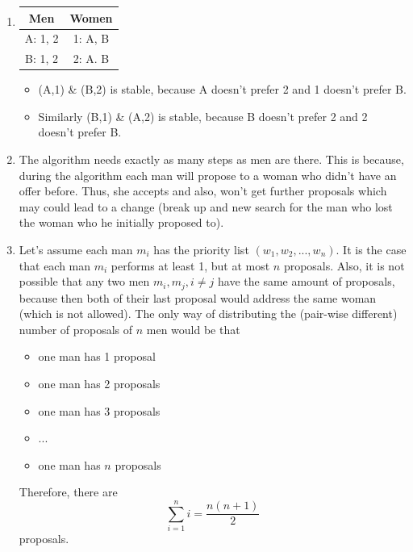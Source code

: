 \documentclass{scrartcl}
\begin{document}
	\begin{enumerate}
		\item\phantom{phantom}
		\begin{center}
			\begin{tabular}{c|c}
				Men & Women\\
				\hline
				A: 1, 2 & 1: A, B\\
				B: 1, 2 & 2: A. B
			\end{tabular}
		\end{center}
		\begin{itemize}
			\item (A,1) \& (B,2) is stable, because A doesn't prefer 2 and 1 doesn't prefer B.
			\item Similarly (B,1) \& (A,2) is stable, because B doesn't prefer 2 and 2 doesn't prefer B.
		\end{itemize}
		
		\item The algorithm needs exactly as many steps as men are there.
		This is because, during the algorithm each man will propose to a woman who didn't have an offer before.
		Thus, she accepts and also, won't get further proposals which may could lead to a change (break up and new search for the man who lost the woman who he initially proposed to).
		
		\item Let's assume each man $m_i$ has the priority list $(w_1, w_2, ..., w_n)$.
		It is the case that each man $m_i$ performs at least 1, but at most $n$ proposals.
		Also, it is not possible that any two men $m_i, m_j, i\neq j$ have the same amount of proposals, because then both of their last proposal would address the same woman (which is not allowed).
		The only way of distributing the (pair-wise different) number of proposals of $n$ men would be that
		\begin{itemize}
			\item one man has 1 proposal
			\item one man has 2 proposals
			\item one man has 3 proposals
			\item ...
			\item one man has $n$ proposals
		\end{itemize}
		Therefore, there are
		\[\sum_{i=1}^ni=\frac{n(n+1)}{2}\]
		proposals.
		

\end{enumerate}
\end{document}
